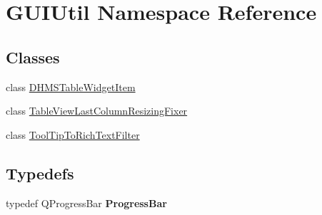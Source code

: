 \hypertarget{namespace_g_u_i_util}{}\section{G\+U\+I\+Util Namespace Reference}
\label{namespace_g_u_i_util}
\subsection*{Classes}
\begin{DoxyCompactItemize}
\item 
class \mbox{\hyperlink{class_g_u_i_util_1_1_d_h_m_s_table_widget_item}{D\+H\+M\+S\+Table\+Widget\+Item}}
\item 
class \mbox{\hyperlink{class_g_u_i_util_1_1_table_view_last_column_resizing_fixer}{Table\+View\+Last\+Column\+Resizing\+Fixer}}
\item 
class \mbox{\hyperlink{class_g_u_i_util_1_1_tool_tip_to_rich_text_filter}{Tool\+Tip\+To\+Rich\+Text\+Filter}}
\end{DoxyCompactItemize}
\subsection*{Typedefs}
\begin{DoxyCompactItemize}
\item 
\mbox{\label{namespace_g_u_i_util_aa539741b94e182723c059c3fc8d58f01}} 
typedef Q\+Progress\+Bar {\bfseries Progress\+Bar}
\end{DoxyCompactItemize}
